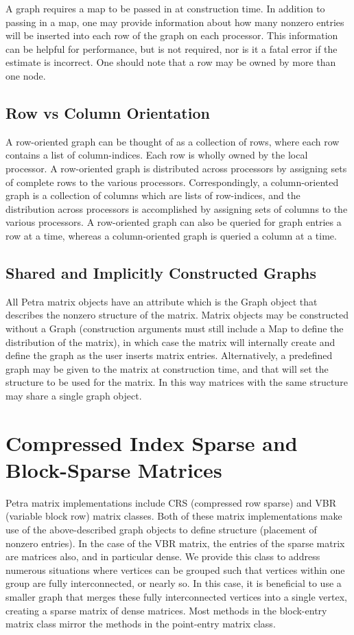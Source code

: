 \documentclass[12pt,relax]{PetraObjectModel}
\begin{document}
A graph requires a map to be passed in at construction time.
In addition to passing in a map, one may provide
information about how many nonzero entries will be inserted into each row 
of the graph on each processor.  This information can be helpful for
performance, but is not required, nor is it a fatal error if the estimate
is incorrect.  One should note that a row may be owned by more than one node.

\subsection{Row vs Column Orientation}
A row-oriented graph can be thought of as a collection of rows, where each row
contains a list of column-indices. Each row is wholly owned by the local
processor. A row-oriented graph is distributed across processors by assigning
sets of complete rows to the various processors. Correspondingly, a
column-oriented graph is a collection of columns which are lists of row-indices,
and the distribution across processors is accomplished by assigning sets of
columns to the various processors.
A row-oriented graph can also be queried for graph entries a row at a time,
whereas a column-oriented graph is queried a column at a time.

\subsection{Shared and Implicitly Constructed Graphs}
All Petra matrix objects have an attribute which is the Graph object that
describes the nonzero structure of the matrix. Matrix objects may be constructed
without a Graph (construction arguments must still include a Map to define the
distribution of the matrix), in which case the matrix will internally create
and define the graph as the user inserts matrix entries. Alternatively, a
predefined graph
may be given to the matrix at construction time, and that will set the
structure to be used for the matrix. In this way matrices with the same
structure may share a single graph object.

\section{Compressed Index Sparse and Block-Sparse Matrices}
Petra matrix implementations include CRS (compressed row sparse) and
VBR (variable block row) matrix classes. Both of these matrix implementations
make use of the above-described graph objects to define structure (placement
of nonzero entries). In the case of the VBR matrix, the entries of the sparse
matrix are matrices also, and in particular dense.  We provide this class
to address numerous situations where vertices can be grouped such that
vertices within one group are fully interconnected, or nearly so.  In this
case, it is beneficial to use a smaller graph that merges these fully
interconnected vertices into a single vertex, creating a sparse matrix of
dense matrices.  Most methods in the block-entry matrix class mirror the
methods in the point-entry matrix class.
\end{document}
